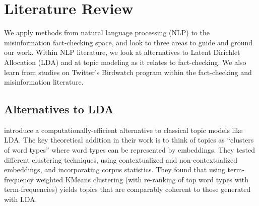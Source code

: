 \documentclass [11pt, proquest] {uwthesis}[2020/02/24]
\begin{document}







\chapter{Literature Review}

We apply methods from natural language processing (NLP) to the misinformation fact-checking space, and look to three areas to guide and ground our work.  Within NLP literature, we look at alternatives to  Latent Dirichlet Allocation (LDA) \cite{blei2003latent} and at topic modeling as it relates to fact-checking. We also learn from studies on Twitter's Birdwatch program within the fact-checking and misinformation literature.

\section{Alternatives to LDA}

 \cite{sia-etal-2020-tired} introduce a computationally-efficient alternative to classical topic models like LDA. The key theoretical addition in their work is to think of  topics as “clusters of word types” where word types can be represented by embeddings.  They tested different clustering techniques, using contextualized and non-contextualized embeddings, and incorporating  corpus statistics. They found that using term-frequency weighted KMeans clustering (with re-ranking of top word types with term-frequencies) yields topics that are comparably coherent to those generated with LDA.
\end{document}
